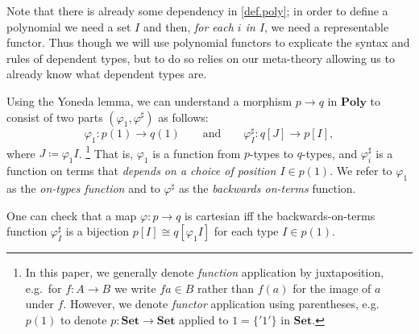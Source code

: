 \documentclass[11pt, one side, article]{memoir}
\theoremstyle{definition}
\theoremstyle{plain}
\newenvironment{remark}
  {\pushQED{\qed}\renewcommand{\qedsymbol}{$\lozenge$}\remarkx}
  {\popQED\endremarkx}
\newcommand{\Cat}[1]{\mathbf{#1}}%
\newcommand{\smset}{\Cat{Set}}
\newcommand{\poly}{\Cat{Poly}}
\newcommand{\0}{\textsf{0}}
\newcommand{\1}{\tn{\textsf{1}}}
\newcommand{\qqand}{\qquad\text{and}\qquad}
\begin{document}
\begin{remark}
Note that there is already some dependency in \cref{def.poly}; in order to define a polynomial we need a set $I$ and then, \emph{for each $i$ in $I$}, we need a representable functor. Thus though we will use polynomial functors to explicate the syntax and rules of dependent types, but to do so relies on our meta-theory allowing us to already know what dependent types are.
\end{remark}

\begin{remark}\label{rem.positions_and_directions}
Using the Yoneda lemma, we can understand a morphism $p\to q$ in $\poly$ to consist of two parts $(\varphi_1,\varphi^\sharp)$ as follows:
\begin{equation}\label{eqn.mapsharp}
  \varphi_1\colon p(1)\to q(1)
  \qqand
  \varphi^\sharp_I\colon q[J]\to p[I],
\end{equation}
where $J\coloneqq\varphi_1 I$.%
\footnote{
In this paper, we generally denote \emph{function} application by juxtaposition, e.g.\ for $f\colon A\to B$ we write $fa\in B$ rather than $f(a)$ for the image of $a$ under $f$. However, we denote \emph{functor} application using parentheses, e.g.\ $p(1)$ to denote $p\colon\smset\to\smset$ applied to $1=\{{'1'}\}$ in $\smset$.
}
 That is, $\varphi_1$ is a function from $p$-types to $q$-types, and $\varphi^\sharp_i$ is a function on terms that \emph{depends on a choice of position $I\in p(1)$}. We refer to $\varphi_1$ as the \emph{on-types function} and to $\varphi^\sharp$ as the \emph{backwards on-terms} function.

One can check that a map $\varphi\colon p\to q$ is cartesian iff the backwards-on-terms function $\varphi^\sharp_I$ is a bijection $p[I]\cong q[\varphi_1I]$ for each type $I\in p(1)$.
\end{remark}
\end{document}

